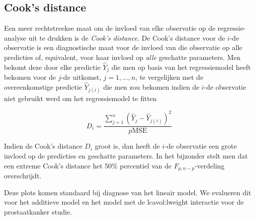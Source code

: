 \documentclass[
  dutch,
  letterpaper,
  12pt]{book}
\theoremstyle{definition}
\theoremstyle{definition}
\theoremstyle{definition}
\theoremstyle{remark}
\begin{document}
\subsection{Cook's distance}\label{cooks-distance}

Een meer rechtstreekse maat om de invloed van elke observatie op de
regressie-analyse uit te drukken is de \emph{Cook's distance}. De Cook's
distance voor de \(i\)-de observatie is een diagnostische maat voor de
invloed van die observatie op alle predicties of, equivalent, voor haar
invloed op \emph{alle} geschatte parameters. Men bekomt deze door elke
predictie \(\hat{Y}_j\) die men op basis van het regressiemodel heeft
bekomen voor de \(j\)-de uitkomst, \(j=1,...,n\), te vergelijken met de
overeenkomstige predictie \(\hat{Y}_{j(i)}\) die men zou bekomen indien
de \(i\)-de observatie niet gebruikt werd om het regressiemodel te
fitten

\[
D_i=\frac{\sum_{j=1}^n(\hat{Y}_j-\hat{Y}_{j(i)})^2}{p\textrm{MSE}}
\]

Indien de Cook's distance \(D_i\) groot is, dan heeft de \(i\)-de
observatie een grote invloed op de predicties en geschatte parameters.
In het bijzonder stelt men dat een extreme Cook's distance het 50\%
percentiel van de \(F_{p,n-p}\)-verdeling overschrijdt.

Deze plots komen standaard bij diagnose van het lineair model. We
evalueren dit voor het additieve model en het model met de
lcavol:lweight interactie voor de prostaatkanker studie.
\end{document}
